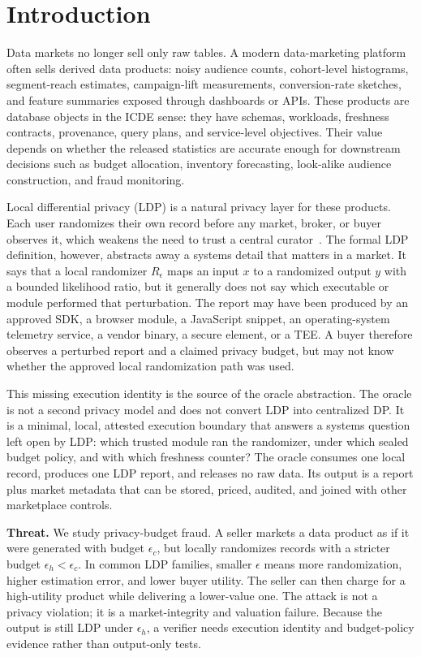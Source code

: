 \documentclass[conference]{IEEEtran}
\newcommand{\eps}{\epsilon}
\begin{document}
\section{Introduction}

Data markets no longer sell only raw tables. A modern data-marketing platform often sells derived data products: noisy audience counts, cohort-level histograms, segment-reach estimates, campaign-lift measurements, conversion-rate sketches, and feature summaries exposed through dashboards or APIs. These products are database objects in the ICDE sense: they have schemas, workloads, freshness contracts, provenance, query plans, and service-level objectives. Their value depends on whether the released statistics are accurate enough for downstream decisions such as budget allocation, inventory forecasting, look-alike audience construction, and fraud monitoring.

Local differential privacy (LDP) is a natural privacy layer for these products. Each user randomizes their own record before any market, broker, or buyer observes it, which weakens the need to trust a central curator~\cite{duchi2013local,kasiviswanathan2011what,erlingsson2014rappor,Wang2017LDPFreq}. The formal LDP definition, however, abstracts away a systems detail that matters in a market. It says that a local randomizer $R_\eps$ maps an input $x$ to a randomized output $y$ with a bounded likelihood ratio, but it generally does not say which executable or module performed that perturbation. The report may have been produced by an approved SDK, a browser module, a JavaScript snippet, an operating-system telemetry service, a vendor binary, a secure element, or a TEE. A buyer therefore observes a perturbed report and a claimed privacy budget, but may not know whether the approved local randomization path was used.

This missing execution identity is the source of the oracle abstraction. The oracle is not a second privacy model and does not convert LDP into centralized DP. It is a minimal, local, attested execution boundary that answers a systems question left open by LDP: which trusted module ran the randomizer, under which sealed budget policy, and with which freshness counter? The oracle consumes one local record, produces one LDP report, and releases no raw data. Its output is a report plus market metadata that can be stored, priced, audited, and joined with other marketplace controls.

\textbf{Threat.} We study privacy-budget fraud. A seller markets a data product as if it were generated with budget $\eps_c$, but locally randomizes records with a stricter budget $\eps_h<\eps_c$. In common LDP families, smaller $\eps$ means more randomization, higher estimation error, and lower buyer utility. The seller can then charge for a high-utility product while delivering a lower-value one. The attack is not a privacy violation; it is a market-integrity and valuation failure. Because the output is still LDP under $\eps_h$, a verifier needs execution identity and budget-policy evidence rather than output-only tests.
\end{document}
